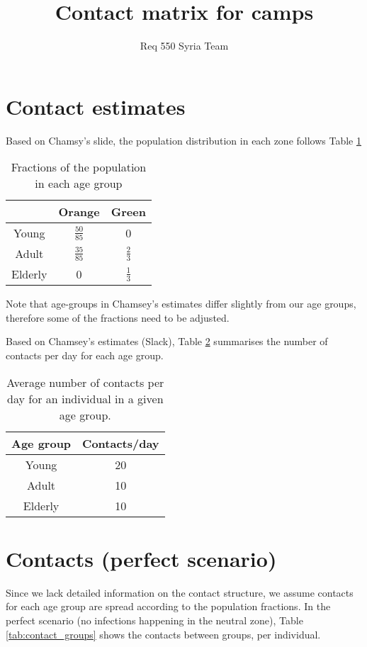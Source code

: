 \documentclass{article}
\title{Contact matrix for camps}
\author{Req 550 Syria Team}
\begin{document}
\maketitle 

\section{Contact estimates}

Based on Chamsy's slide, the population distribution in each zone follows Table
\ref{tab:pop_distro}

\begin{table}[h!]
\begin{center}
\begin{tabular}{ |c|c|c| } 
 \hline
        & Orange        & Green \\ 
\hline
Young   & $\frac{50}{85}$ & 0 \\ 
\hline
Adult   & $\frac{35}{85}$ & $\frac{2}{3}$ \\ 
\hline
Elderly & 0               & $\frac{1}{3}$  \\ 
\hline
\end{tabular}
\caption{Fractions of the population in each age group}
\label{tab:pop_distro}
\end{center}
\end{table}

Note that age-groups in Chamsey's estimates differ slightly from our age
groups, therefore some of the fractions need to be adjusted.

Based on Chamsey's estimates (Slack), Table \ref{tab:contacts} summarises the
number of contacts per day for each age group.

\begin{table}[h!]
\begin{center}
\begin{tabular}{ |c|c| } 
 \hline
Age group & Contacts/day \\ 
\hline
Young     & 20 \\ 
\hline
Adult     & 10 \\ 
\hline
Elderly   & 10 \\ 
\hline
\end{tabular}
\caption{Average number of contacts per day for an individual in a given age
group.}
\label{tab:contacts}
\end{center}
\end{table}

\section{Contacts (perfect scenario)}
Since we lack detailed information on the contact structure, we assume contacts
for each age group are spread according to the population fractions. In the
perfect scenario (no infections happening in the neutral zone), Table
\ref{tab:contact_groups} shows the contacts between groups, per individual.
\end{document}
